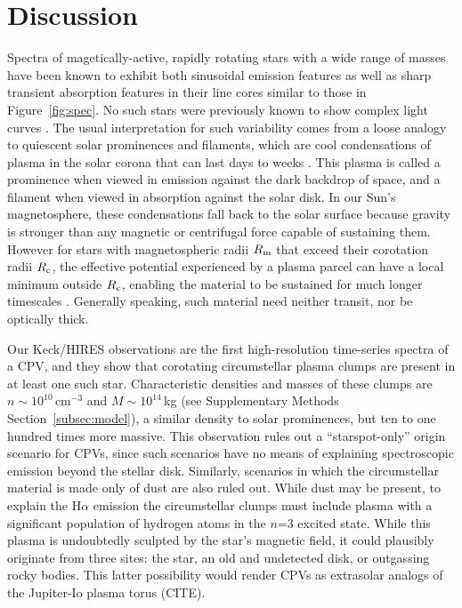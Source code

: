 \documentclass{nature3}
\begin{document}
\section{Discussion}

Spectra of magetically-active, rapidly rotating stars with a wide range of masses
have been known to exhibit both sinusoidal emission features
\cite{Donati2000,Townsend2005,Dunstone2006,Skelly2008} as well as
sharp transient absorption features in their line cores
\cite{CollierCameron1989,CollierCameron1992,Cang2020} similar to those
in Figure~\ref{fig:spec}.  No such stars were previously known to show
complex light curves \cite{Bouma2024}.  The usual interpretation for
such variability comes from a loose analogy to
quiescent solar prominences and filaments, which are cool
condensations of plasma in the solar corona that can last days to
weeks \cite{VialEngvold2015}.  This plasma is called a prominence when
viewed in emission against the dark backdrop of space, and a filament
when viewed in absorption against the solar disk.  In our Sun's
magnetosphere, these condensations fall back to the solar surface
because gravity is stronger than any magnetic or centrifugal force
capable of sustaining them.  However for stars with magnetospheric
radii $R_{\rm m}$ that exceed their corotation radii $R_{\rm c}$, the
effective potential experienced by a plasma parcel can have a local minimum
outside $R_{\rm c}$, enabling the material to be sustained for
much longer timescales \cite{Petit2013,Daley-Yates2024}.  Generally
speaking, such material need neither transit, nor be optically thick.

Our Keck/HIRES observations are the first high-resolution time-series
spectra of a CPV, and they show that corotating circumstellar plasma clumps 
are present in at least one such star.
Characteristic densities and masses of these
clumps are $n \sim 10^{10}$\,cm$^{-3}$ and $M \sim 10^{14}$\,kg (see
Supplementary Methods Section~\ref{subsec:model}), a similar density
to solar prominences, but ten to one hundred times more massive.  This
observation rules out a ``starspot-only'' origin scenario for CPVs,
\cite{Koen2021} since such scenarios have no means of explaining
spectroscopic emission beyond the stellar disk.  Similarly, scenarios
in which the circumstellar material is made only of dust are also
ruled out.  While dust may be present, to explain the H$\alpha$
emission the circumstellar clumps must include plasma with a
significant population of hydrogen atoms in the $n$=3 excited state.
While this plasma is undoubtedly sculpted by the star's magnetic
field, it could plausibly originate from three sites: the star, an old
and undetected disk, or outgassing rocky bodies.  This latter
possibility would render CPVs as extrasolar analogs of the Jupiter-Io
plasma torus (CITE).
\end{document}
